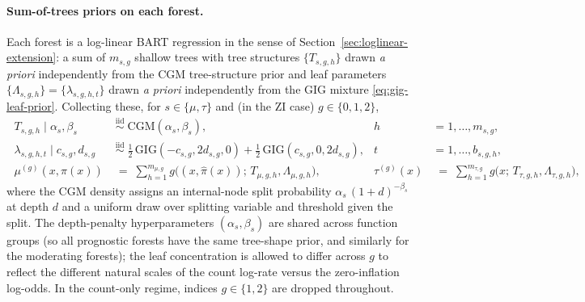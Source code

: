 \documentclass[11pt]{article}
\theoremstyle{plain}
\theoremstyle{definition}
\theoremstyle{remark}
\newcommand{\GIG}{\mathrm{GIG}}
\newcommand{\pihat}{\widehat{\pi}}
\newcommand{\leafc}{c}
\newcommand{\leafd}{d}
\begin{document}
\paragraph{Sum-of-trees priors on each forest.}
Each forest is a log-linear BART regression in the sense of
Section~\ref{sec:loglinear-extension}: a sum of $m_{s,g}$ shallow
trees with tree structures $\{T_{s,g,h}\}$ drawn \emph{a priori}
independently from the CGM tree-structure prior and leaf parameters
$\{\Lambda_{s,g,h}\} = \{\lambda_{s, g, h, t}\}$ drawn \emph{a priori}
independently from the GIG mixture \eqref{eq:gig-leaf-prior}.
Collecting these, for $s \in \{\mu, \tau\}$ and (in the ZI case)
$g \in \{0, 1, 2\}$,
\begin{equation}
  \boxed{\;
    \begin{aligned}
      T_{s, g, h} \;\big|\; \alpha_s, \beta_s
        &\;\stackrel{\mathrm{iid}}{\sim}\;
          \mathrm{CGM}(\alpha_s, \beta_s),
          & h &= 1, \dots, m_{s, g}, \\[2pt]
      \lambda_{s, g, h, t} \;\big|\; \leafc_{s,g}, \leafd_{s,g}
        &\;\stackrel{\mathrm{iid}}{\sim}\;
          \tfrac{1}{2}\,\GIG(-\leafc_{s,g}, 2\leafd_{s,g}, 0)
          + \tfrac{1}{2}\,\GIG(\leafc_{s,g}, 0, 2\leafd_{s,g}),
          & t &= 1, \dots, b_{s, g, h}, \\[2pt]
      \mu^{(g)}(x, \pihat(x))
        &\;=\; \sum_{h=1}^{m_{\mu, g}} g\!\bigl((x, \pihat(x));\, T_{\mu, g, h}, \Lambda_{\mu, g, h}\bigr),
        & \tau^{(g)}(x)
        &\;=\; \sum_{h=1}^{m_{\tau, g}} g\bigl(x;\, T_{\tau, g, h}, \Lambda_{\tau, g, h}\bigr),
    \end{aligned}
  \;}
  \label{eq:zicountbcf-prior}
\end{equation}
where the CGM density assigns an internal-node split probability
$\alpha_s\,(1+d)^{-\beta_s}$ at depth $d$ and a uniform draw over
splitting variable and threshold given the split. The
depth-penalty hyperparameters $(\alpha_s, \beta_s)$ are shared across
function groups (so all prognostic forests have the same tree-shape
prior, and similarly for the moderating forests); the leaf
concentration is allowed to differ across $g$ to reflect the
different natural scales of the count log-rate versus the
zero-inflation log-odds. In the count-only regime, indices $g \in
\{1, 2\}$ are dropped throughout.
\end{document}
